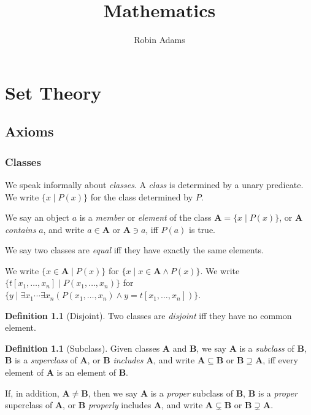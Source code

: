 \documentclass{book}
\title{Mathematics}
\author{Robin Adams}
\theoremstyle{definition}
\newtheorem{df}[prop]{Definition}
\begin{document}
\maketitle
\tableofcontents

\part{Set Theory}

\chapter{Axioms}

\section{Classes}

We speak informally about \emph{classes}. A \emph{class} is determined by a unary predicate. We write $\{ x \mid P(x) \}$ for the class determined by $P$.

We say an object $a$ is a \emph{member} or \emph{element} of the class $\mathbf{A} = \{ x \mid P(x) \}$, or $\mathbf{A}$ \emph{contains} $a$, and write $a \in \mathbf{A}$ or $\mathbf{A} \ni a$, iff $P(a)$ is true. 

We say two classes are \emph{equal} iff they have exactly the same elements.

We write $\{ x \in \mathbf{A} \mid P(x) \}$ for $\{ x \mid x \in \mathbf{A} \wedge P(x) \}$. We write $\{ t[x_1, \ldots, x_n] \mid P(x_1, \ldots, x_n) \}$ for $\{ y \mid \exists x_1 \cdots \exists x_n (P(x_1, \ldots, x_n) \wedge y = t[x_1, \ldots, x_n])\}$.

\begin{df}[Disjoint]
    Two classes are \emph{disjoint} iff they have no common element.
\end{df}

\begin{df}[Subclass]
    Given classes $\mathbf{A}$ and $\mathbf{B}$, we say $\mathbf{A}$ is a \emph{subclass} of $\mathbf{B}$, $\mathbf{B}$ is a \emph{superclass} of $\mathbf{A}$, or $\mathbf{B}$ \emph{includes} $\mathbf{A}$, and write $\mathbf{A} \subseteq \mathbf{B}$ or $\mathbf{B} \supseteq \mathbf{A}$, iff every element of $\mathbf{A}$ is an element of $\mathbf{B}$.

    If, in addition, $\mathbf{A} \neq \mathbf{B}$, then we say $\mathbf{A}$ is a \emph{proper} subclass of $\mathbf{B}$, $\mathbf{B}$ is a \emph{proper} superclass of $\mathbf{A}$, or $\mathbf{B}$ \emph{properly} includes $\mathbf{A}$, and write $\mathbf{A} \subsetneq \mathbf{B}$ or $\mathbf{B} \supsetneq \mathbf{A}$.
\end{df}
\end{document}
